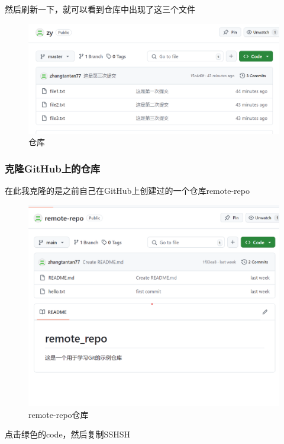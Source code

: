 \documentclass{ctexart}
\begin{document}
	然后刷新一下，就可以看到仓库中出现了这三个文件
	\begin{figure}[H]
		\centering
		\includegraphics[scale=0.5]{15}
		\caption{仓库}
	\end{figure}
	
	\subsubsection{克隆GitHub上的仓库}
	在此我克隆的是之前自己在GitHub上创建过的一个仓库remote-repo
	\begin{figure}[H]
		\centering
		\includegraphics[scale=0.5]{23}
		\caption{remote-repo仓库}
	\end{figure}
	点击绿色的code，然后复制SSHSH
\end{document}
